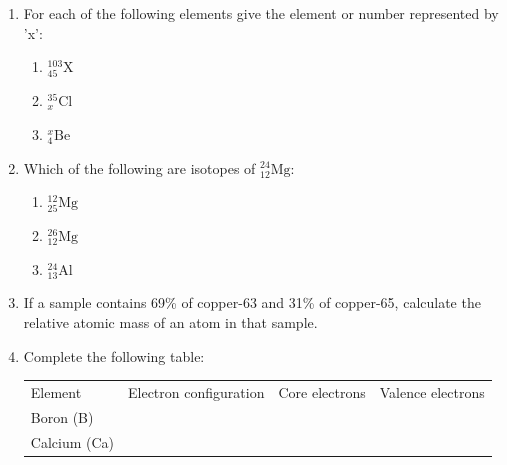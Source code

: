 \begin{enumerate}[noitemsep, label=\textbf{\arabic*}. ]
\item For each of the following elements give the element or number represented by 'x': \label{m38741*id7434324}\begin{enumerate}[noitemsep, label=\textbf{\alph*}. ] 
            \item $_{45}^{103}\mathrm{X}$\item $_{x}^{35}\mathrm{Cl}$\item $_{4}^{x}\mathrm{Be}$\end{enumerate}
\item Which of the following are isotopes of $_{12}^{24}\mathrm{Mg}$: \label{m38741*id743234}\begin{enumerate}[noitemsep, label=\textbf{\alph*}. ] 
            \item $_{25}^{12}\mathrm{Mg}$\item $_{12}^{26}\mathrm{Mg}$\item $_{13}^{24}\mathrm{Al}$\end{enumerate}
\item If a sample contains 69\% of copper-63 and 31\% of copper-65, calculate the relative atomic mass of an atom in that sample.\newline
            \item Complete the following table:
          \begin{table}[H]
        \begin{center}
      \label{m38741*eip-282}
    \noindent
      \tablelasttail{}
      \begin{xtabular}[t]{|l|l|l|l|}\hline
        Element &
        Electron configuration &
        Core electrons &
        Valence electrons%
     \tabularnewline{}
        Boron (B) &
         &
         &
     \tabularnewline{}
        Calcium (Ca) &
         &
         &
     \tabularnewline{}

\end{xtabular}
\end{center}
\end{table}
\end{enumerate}
